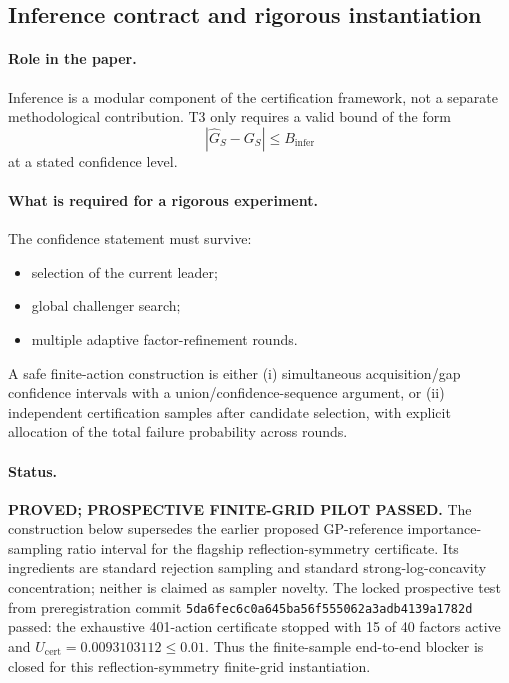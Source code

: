 \subsection{Inference contract and rigorous instantiation}

\paragraph{Role in the paper.}
Inference is a modular component of the certification framework, not a separate
methodological contribution.  T3 only requires a valid bound of the form
\[
    |\widehat G_S-G_S|\le B_{\mathrm{infer}}
\]
at a stated confidence level.

\paragraph{What is required for a rigorous experiment.}
The confidence statement must survive:
\begin{itemize}
    \item selection of the current leader;
    \item global challenger search;
    \item multiple adaptive factor-refinement rounds.
\end{itemize}
A safe finite-action construction is either (i) simultaneous acquisition/gap
confidence intervals with a union/confidence-sequence argument, or (ii)
independent certification samples after candidate selection, with explicit
allocation of the total failure probability across rounds.

\paragraph{Status.}
\textbf{PROVED; PROSPECTIVE FINITE-GRID PILOT PASSED.}  The construction below
supersedes the earlier proposed GP-reference importance-sampling ratio interval
for the flagship reflection-symmetry certificate.  Its ingredients are standard
rejection sampling and standard strong-log-concavity concentration; neither is
claimed as sampler novelty.  The locked prospective test from preregistration
commit \texttt{5da6fec6c0a645ba56f555062a3adb4139a1782d} passed: the exhaustive
401-action certificate stopped with 15 of 40 factors active and
$U_{\mathrm{cert}}=0.0093103112\le0.01$.  Thus the finite-sample end-to-end
blocker is closed for this reflection-symmetry finite-grid instantiation.

